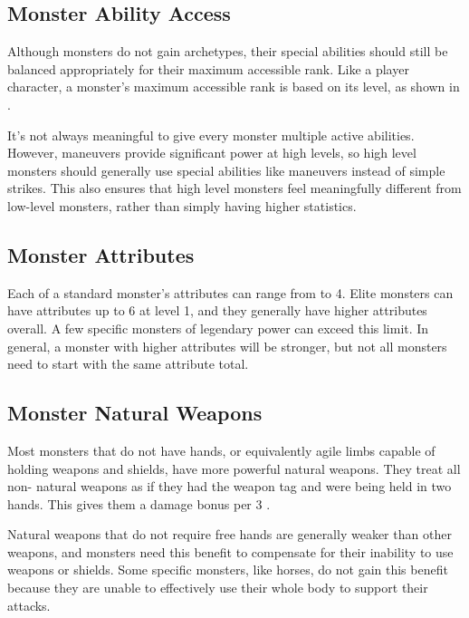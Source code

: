         \subsection{Monster Ability Access}\label{Monster Ability Access}
            Although monsters do not gain archetypes, their special abilities should still be balanced appropriately for their maximum accessible rank.
            Like a player character, a monster's maximum accessible rank is based on its level, as shown in .

            It's not always meaningful to give every monster multiple active abilities.
            However, maneuvers provide significant power at high levels, so high level monsters should generally use special abilities like maneuvers instead of simple strikes.
            This also ensures that high level monsters feel meaningfully different from low-level monsters, rather than simply having higher statistics.

    \subsection{Monster Attributes}\label{Monster Attributes}
        Each of a standard monster's attributes can range from  to 4.
        Elite monsters can have attributes up to 6 at level 1, and they generally have higher attributes overall.
        A few specific monsters of legendary power can exceed this limit.
        In general, a monster with higher attributes will be stronger, but not all monsters need to start with the same attribute total.

    \subsection{Monster Natural Weapons}\label{Monster Natural Weapon}
        Most monsters that do not have hands, or equivalently agile limbs capable of holding weapons and shields, have more powerful natural weapons.
        They treat all non- natural weapons as if they had the  weapon tag and were being held in two hands.
        This gives them a  damage bonus per 3 .

        Natural weapons that do not require free hands are generally weaker than other weapons, and monsters need this benefit to compensate for their inability to use weapons or shields.
        Some specific monsters, like horses, do not gain this benefit because they are unable to effectively use their whole body to support their attacks.

